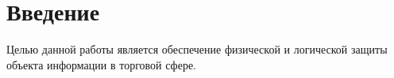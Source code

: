 \section*{Введение}

Целью данной работы является обеспечение физической и логической защиты объекта информации в торговой сфере.

